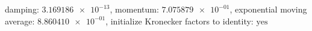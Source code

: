 damping: $\num[scientific-notation=true]{3.169186e-13}$, momentum: $\num[scientific-notation=true]{7.075879e-01}$, exponential moving average: $\num[scientific-notation=true]{8.860410e-01}$, initialize Kronecker factors to identity: $\text{yes}$